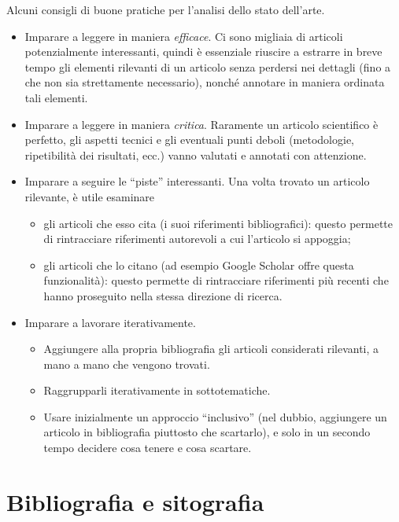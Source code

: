 \documentclass[12pt]{report}
\begin{document}
    Alcuni consigli di buone pratiche per l'analisi dello stato dell'arte.
    \begin{itemize}
        \item Imparare a leggere in maniera {\em efficace}. Ci sono migliaia di articoli potenzialmente interessanti, quindi \`e essenziale riuscire a estrarre in breve tempo gli elementi rilevanti di un articolo senza perdersi nei dettagli (fino a che non sia strettamente necessario), nonch\'e annotare in maniera ordinata tali elementi.
        \item Imparare a leggere in maniera {\em critica}. Raramente un articolo scientifico \`e perfetto, gli aspetti tecnici e gli eventuali punti deboli (metodologie, ripetibilit\`a dei risultati, ecc.) vanno valutati e annotati con attenzione.
        \item Imparare a seguire le ``piste'' interessanti. Una volta trovato un articolo rilevante, \`e utile esaminare
        \begin{itemize}
            \item gli articoli che esso cita (i suoi riferimenti bibliografici): questo permette di rintracciare riferimenti autorevoli a cui l'articolo si appoggia;
            \item gli articoli che lo citano (ad esempio Google Scholar offre questa funzionalit\`a): questo permette di rintracciare riferimenti pi\`u recenti che hanno proseguito nella stessa direzione di ricerca.
        \end{itemize}
        \item Imparare a lavorare iterativamente.
        \begin{itemize}
            \item Aggiungere alla propria bibliografia gli articoli considerati rilevanti, a mano a mano che vengono trovati.
            \item Raggrupparli iterativamente in sottotematiche.
            \item Usare inizialmente un approccio ``inclusivo'' (nel dubbio, aggiungere un articolo in bibliografia piuttosto che scartarlo), e solo in un secondo tempo decidere cosa tenere e cosa scartare.
        \end{itemize}
    \end{itemize}


    \section{Bibliografia e sitografia}
    \label{sec:biblio}
\end{document}
